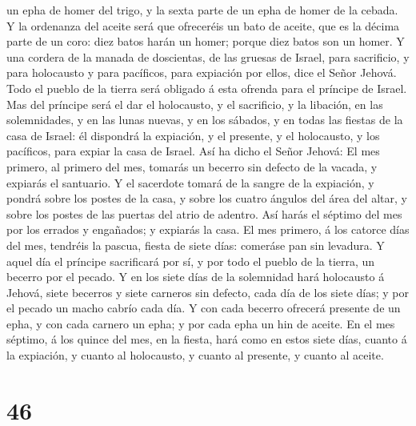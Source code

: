 un epha de homer del trigo, y la sexta parte de un epha de homer de la
cebada.  Y la ordenanza del aceite será que ofreceréis un
bato de aceite, que es la décima parte de un coro: diez batos harán un
homer; porque diez batos son un homer.  Y una cordera de
la manada de doscientas, de las gruesas de Israel, para sacrificio, y
para holocausto y para pacíficos, para expiación por ellos, dice el
Señor Jehová.  Todo el pueblo de la tierra será obligado
á esta ofrenda para el príncipe de Israel.  Mas del
príncipe será el dar el holocausto, y el sacrificio, y la libación, en
las solemnidades, y en las lunas nuevas, y en los sábados, y en todas
las fiestas de la casa de Israel: él dispondrá la expiación, y el
presente, y el holocausto, y los pacíficos, para expiar la casa de
Israel.  Así ha dicho el Señor Jehová: El mes primero, al
primero del mes, tomarás un becerro sin defecto de la vacada, y expiarás
el santuario.  Y el sacerdote tomará de la sangre de la
expiación, y pondrá sobre los postes de la casa, y sobre los cuatro
ángulos del área del altar, y sobre los postes de las puertas del atrio
de adentro.  Así harás el séptimo del mes por los errados
y engañados; y expiarás la casa.  El mes primero, á los
catorce días del mes, tendréis la pascua, fiesta de siete días: comeráse
pan sin levadura.  Y aquel día el príncipe sacrificará
por sí, y por todo el pueblo de la tierra, un becerro por el pecado.
 Y en los siete días de la solemnidad hará holocausto á
Jehová, siete becerros y siete carneros sin defecto, cada día de los
siete días; y por el pecado un macho cabrío cada día.  Y
con cada becerro ofrecerá presente de un epha, y con cada carnero un
epha; y por cada epha un hin de aceite.  En el mes
séptimo, á los quince del mes, en la fiesta, hará como en estos siete
días, cuanto á la expiación, y cuanto al holocausto, y cuanto al
presente, y cuanto al aceite.

\hypertarget{section-45}{%
\section{46}\label{section-45}}

